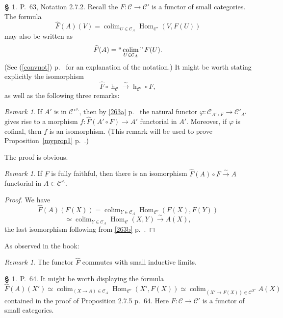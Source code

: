\documentclass[12pt]{article}%
\theoremstyle{remark}
\newtheorem{rk}[thm]{Remark}
\theoremstyle{definition}
\newtheorem{s}[thm]{\S}%
\newcommand{\cc}{\mathcal}
\newcommand{\C}{\mathcal C}
\newcommand{\xr}{\xrightarrow}
\DeclareMathOperator*{\colim}{colim}
\DeclareMathOperator*{\icolim}{``\colim"}
\DeclareMathOperator{\hy}{h}
\DeclareMathOperator{\Hom}{Hom}%
\begin{document}
\begin{s} 
P.~63, Notation 2.7.2. Recall the $F:\C\to\C'$ is a functor of small categories. The formula 
$$
\widehat F(A)(V)=\colim_{U\in\C_A}\Hom_{\C'}(V,F(U))
$$
may also be written as 
$$
\widehat F(A)=\icolim_{U\in\C_A}F(U).
$$
(See (\ref{convnot}) p.~\pageref{convnot} for an explanation of the notation.) It might be worth stating explicitly the isomorphism 
$$
\widehat F\circ\hy_\C\xr\sim\hy_{\C'}\circ F,
$$
as well as the following three remarks:

\begin{rk}\label{cof}
If $A'$ is in $\cc C'^\wedge$, then by \eqref{263a} p.~\pageref{263a} the natural functor $\varphi:\cc C_{A'\circ F}\to\cc C'_{A'}$ gives rise to a morphism $f:\widehat F(A'\circ F)\to A'$ functorial in $A'$. Moreover, if $\varphi$ is cofinal, then $f$ is an isomorphism. (This remark will be used to prove Proposition~\ref{myprop1} p.~\pageref{myprop1}.)
\end{rk}

The proof is obvious.

\begin{rk}
If $F$ is fully faithful, then there is an isomorphism $\widehat F(A)\circ F\xr\sim A$ functorial in $A\in\C^\wedge$.
\end{rk} 

\begin{proof}
We have 
$$
\widehat F(A)(F(X))=\colim_{Y\in\C_A}\Hom_{\C'}(F(X),F(Y))
$$
$$
\simeq\colim_{Y\in\C_A}\Hom_\C(X,Y)\xr\sim A(X),
$$
the last isomorphism following from \eqref{263b} p.~\pageref{263b}.
\end{proof}

As observed in the book:

\begin{rk}\label{272}
The functor $\widehat F$ commutes with small inductive limits.
\end{rk}
\end{s}

%

\begin{s} 
P.~64. It might be worth displaying the formula 
\begin{equation}\label{275}
\widehat F(A)(X')\simeq\colim_{(X\to A)\in\C_A}\Hom_{\C'}(X',F(X))\simeq
\colim_{(X'\to F(X))\in\C^{X'}}A(X)
\end{equation}
contained in the proof of Proposition 2.7.5 p.~64. Here $F:\C\to\C'$ is a functor of small categories. 
\end{s}
\end{document}
